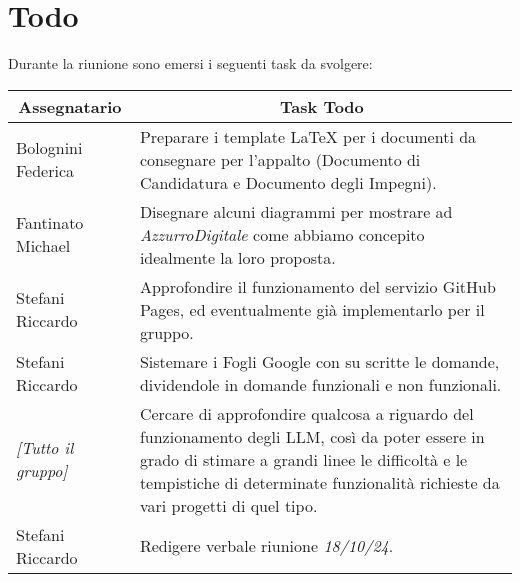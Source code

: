 \section{Todo}

Durante la riunione sono emersi i seguenti task da svolgere:

\vspace{0.5cm}

\begin{table}[htbp]
\begin{tabular}{|p{}|p{}|}
    \hline
    \multicolumn{1}{|c|}{\textbf{Assegnatario}} & \multicolumn{1}{|c|}{\textbf{Task Todo}} \\
    \hline
    Bolognini Federica & Preparare i template LaTeX per i documenti da consegnare per l'appalto (Documento di Candidatura e Documento degli Impegni). \\
    \hline
    Fantinato Michael & Disegnare alcuni diagrammi per mostrare ad \emph{AzzurroDigitale} come abbiamo concepito idealmente la loro proposta. \\
    \hline
    Stefani Riccardo & Approfondire il funzionamento del servizio GitHub Pages, ed eventualmente già implementarlo per il gruppo. \\
    \hline
    Stefani Riccardo & Sistemare i Fogli Google con su scritte le domande, dividendole in domande funzionali e non funzionali. \\
    \hline
    \emph{[Tutto il gruppo]} & Cercare di approfondire qualcosa a riguardo del funzionamento degli LLM, così da poter essere in grado di stimare a grandi linee le difficoltà e le tempistiche di determinate funzionalità richieste da vari progetti di quel tipo. \\
    \hline
    Stefani Riccardo & Redigere verbale riunione \emph{18/10/24}. \\
    \hline
\end{tabular}
\end{table}